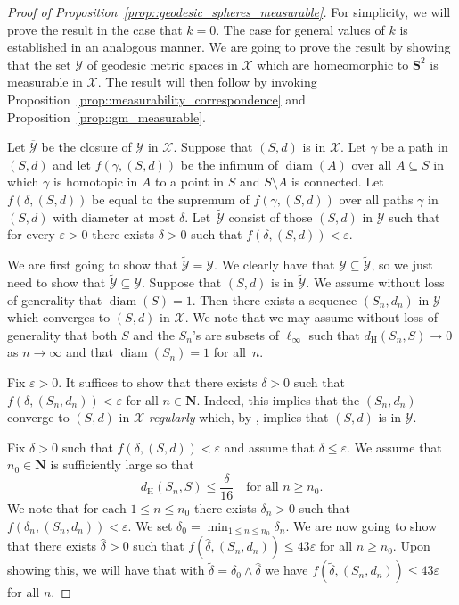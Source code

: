 \documentclass[10pt]{amsart}
\let\mathcal\mathscr
\let\epsilon\varepsilon
\theoremstyle{plain}
\numberwithin{theorem}{section}
\theoremstyle{definition}
\newcommand{\N}{\mathbf{N}}
\renewcommand{\S}{{\mathbf S}}
\DeclareMathOperator{\diam}{diam}
\newcommand{\gh}{{\mathcal X}}
\renewcommand{\dh}{d_{\mathrm{H}}}
\newcommand{\spheresgeo}{{\mathcal Y}}
\newcommand{\spheresgeoclose}{\ol{\spheresgeo}}
\let\ol\overline
\let\wh\widehat
\let\wt\widetilde
\begin{document}
\begin{proof}[Proof of Proposition~\ref{prop::geodesic_spheres_measurable}]
For simplicity, we will prove the result in the case that $k=0$. The case for general values of $k$ is established in an analogous manner. We are going to prove the result by showing that the set $\spheresgeo$ of geodesic metric spaces in $\gh$ which are homeomorphic to $\S^2$ is measurable in $\gh$. The result will then follow by invoking Proposition~\ref{prop::measurability_correspondence} and Proposition~\ref{prop::gm_measurable}.

Let $\spheresgeoclose$ be the closure of $\spheresgeo$ in $\gh$. Suppose that $(S,d)$ is in $\gh$. Let $\gamma$ be a path in $(S,d)$ and let $f(\gamma,(S,d))$ be the infimum of $\diam(A)$ over all $A \subseteq S$ in which $\gamma$ is homotopic in $A$ to a point in $S$ and $S \setminus A$ is connected. Let $f(\delta,(S,d))$ be equal to the supremum of $f(\gamma,(S,d))$ over all paths $\gamma$ in $(S,d)$ with diameter at most $\delta$. Let~$\wt{\spheresgeo}$ consist of those $(S,d)$ in $\spheresgeoclose$ such that for every $\epsilon > 0$ there exists $\delta > 0$ such that $f(\delta,(S,d)) < \epsilon$.

We are first going to show that $\wt{\spheresgeo}=\spheresgeo$. We clearly have that $\spheresgeo \subseteq \wt{\spheresgeo}$, so we just need to show that $\wt{\spheresgeo} \subseteq \spheresgeo$. Suppose that $(S,d)$ is in $\wt{\spheresgeo}$. We assume without loss of generality that $\diam(S) = 1$. Then there exists a sequence $(S_n,d_n)$ in $\spheresgeo$ which converges to $(S,d)$ in $\gh$. We note that we may assume without loss of generality that both $S$ and the $S_n$'s are subsets of $\ell_\infty$ such that $\dh(S_n,S) \to 0$ as $n \to \infty$ and that $\diam(S_n) = 1$ for all~$n$.

Fix $\epsilon > 0$. It suffices to show that there exists $\delta > 0$ such that $f(\delta,(S_n,d_n)) < \epsilon$ for all $n \in \N$. Indeed, this implies that the $(S_n,d_n)$ converge to $(S,d)$ in $\gh$ \emph{regularly} which, by \cite{begle_regular}, implies that $(S,d)$ is in $\spheresgeo$.

Fix $\delta > 0$ such that $f(\delta,(S,d)) < \epsilon$ and assume that $\delta \leq \epsilon$. We assume that $n_0 \in \N$ is sufficiently large so that
\begin{equation}
\label{eqn::ms_close}
\dh(S_n,S) \leq \frac{\delta}{16} \quad\text{for all } n \geq n_0.
\end{equation}
We note that for each $1 \leq n \leq n_0$ there exists $\delta_n > 0$ such that $f(\delta_n,(S_n,d_n)) < \epsilon$. We set $\delta_0 = \min_{1 \leq n \leq n_0} \delta_n$. We are now going to show that there exists $\wh{\delta} > 0$ such that $f(\wh{\delta},(S_n,d_n)) \leq 43 \epsilon$ for all $n \geq n_0$. Upon showing this, we will have that with $\wt{\delta} = \delta_0 \wedge \wh{\delta}$ we have $f(\wt{\delta},(S_n,d_n)) \leq 43\epsilon$ for all $n$.


\end{proof}
\end{document}
